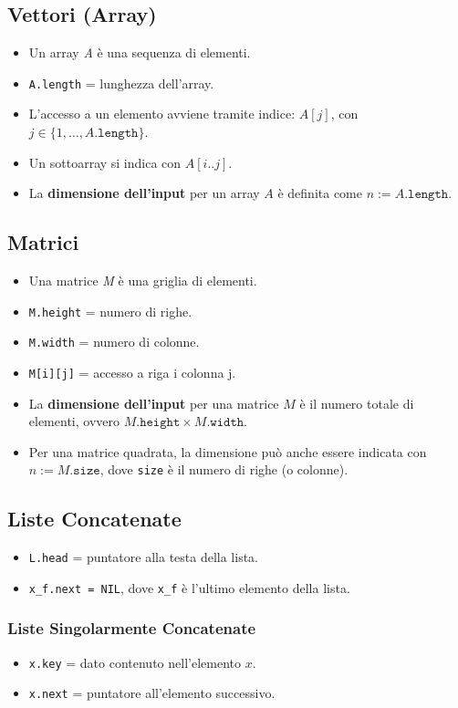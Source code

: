 \subsection{Vettori (Array)}
\begin{itemize}
    \item Un array \textit{A} è una sequenza di elementi.
    \item \texttt{A.length} = lunghezza dell'array.
    \item L'accesso a un elemento avviene tramite indice: $A[j]$, con $j \in \{1, \dots, A.\texttt{length}\}$.
    \item Un sottoarray si indica con $A[i..j]$.
    \item La \textbf{dimensione dell'input} per un array $A$ è definita come $n := A.\texttt{length}$.
\end{itemize}

\subsection{Matrici}
\begin{itemize}
    \item Una matrice \textit{M} è una griglia di elementi.
    \item \texttt{M.height} = numero di righe.
    \item \texttt{M.width} = numero di colonne.
    \item \texttt{M[i][j]} = accesso a riga i colonna j.
    \item La \textbf{dimensione dell'input} per una matrice $M$ è il numero totale di elementi, ovvero $M.\texttt{height} \times M.\texttt{width}$.
    \item Per una matrice quadrata, la dimensione può anche essere indicata con $n := M.\texttt{size}$, dove \texttt{size} è il numero di righe (o colonne).
\end{itemize}

\subsection{Liste Concatenate}
\begin{itemize}
    \item \texttt{L.head} = puntatore alla testa della lista.
    \item \texttt{x\_f.next = NIL}, dove \texttt{x\_f} è l'ultimo elemento della lista.
\end{itemize}

\subsubsection{Liste Singolarmente Concatenate}
\begin{itemize}
    \item \texttt{x.key} = dato contenuto nell'elemento $x$.
    \item \texttt{x.next} = puntatore all'elemento successivo.
\end{itemize}

